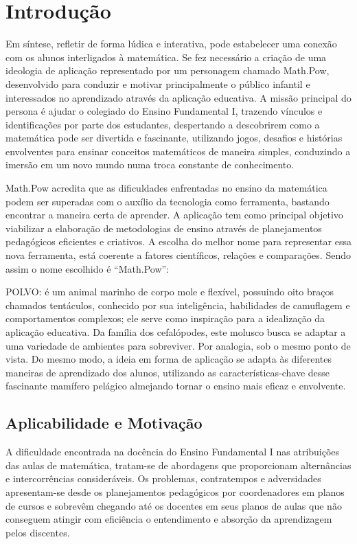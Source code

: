 \chapter{Introdução}\label{chp:intro}

Em síntese, refletir de forma lúdica e interativa, pode estabelecer uma conexão com os alunos interligados à matemática. Se fez necessário a criação de uma ideologia de  aplicação representado por um personagem chamado Math.Pow, desenvolvido para conduzir e motivar principalmente o público infantil e interessados no aprendizado através da aplicação educativa. A missão principal do persona é ajudar o colegiado do Ensino Fundamental I, trazendo vínculos e identificações por parte dos estudantes, despertando a descobrirem como a matemática pode ser divertida e fascinante, utilizando jogos, desafios e histórias envolventes para ensinar conceitos matemáticos de maneira simples, conduzindo a imersão em um novo mundo numa troca constante de conhecimento. \cite{Lopes2020}

Math.Pow acredita que as dificuldades enfrentadas no ensino da matemática podem ser superadas com o auxílio da tecnologia como ferramenta, bastando encontrar a maneira certa de aprender. A aplicação tem como principal objetivo viabilizar a elaboração de metodologias de ensino através de planejamentos pedagógicos eficientes e criativos. A escolha do melhor nome para representar essa nova ferramenta, está coerente a fatores científicos, relações e comparações. Sendo assim o nome escolhido é “Math.Pow”:

POLVO: é um animal marinho de corpo mole e flexível, possuindo oito braços chamados tentáculos, conhecido por sua inteligência, habilidades de camuflagem e comportamentos complexos; ele serve como inspiração para a idealização da aplicação educativa. Da família dos cefalópodes, este molusco busca se adaptar a uma variedade de ambientes para sobreviver. Por analogia, sob o mesmo ponto de vista. Do mesmo modo, a ideia em forma de aplicação se adapta às diferentes maneiras de aprendizado dos alunos, utilizando as características-chave desse fascinante mamífero pelágico almejando tornar o ensino mais eficaz e envolvente.\cite{BBC2023}




\section{Aplicabilidade e Motivação}\label{chp:aplic}

A dificuldade encontrada na docência do Ensino Fundamental I nas atribuições das aulas de matemática, tratam-se de abordagens que proporcionam alternâncias e intercorrências consideráveis. Os problemas, contratempos e adversidades apresentam-se desde os planejamentos pedagógicos por coordenadores em planos de cursos e sobrevêm chegando até os docentes em seus planos de aulas que não conseguem atingir com eficiência o entendimento e absorção da aprendizagem pelos discentes. 

